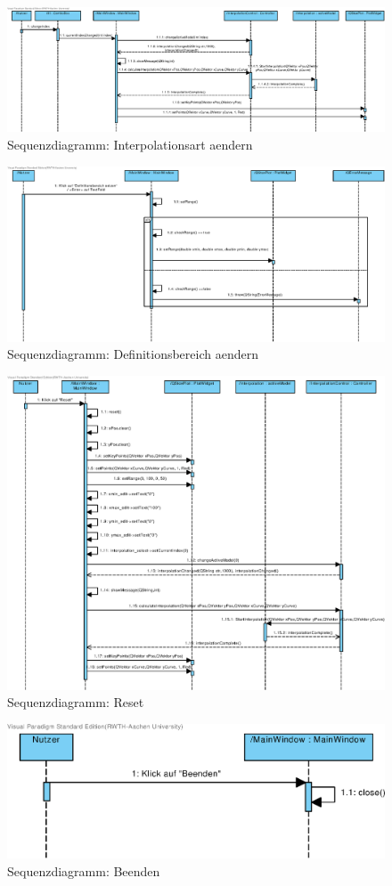 \begin{figure}
\centering
\includegraphics[width=\textwidth]{figures/sequenzdiagramme/interpolation_aendern.eps}
\caption{Sequenzdiagramm: Interpolationsart aendern}
\end{figure}

\begin{figure}
\centering
\includegraphics[width=\textwidth]{figures/sequenzdiagramme/definitionsbereich_aendern.eps}
\caption{Sequenzdiagramm: Definitionsbereich aendern}
\end{figure}

\begin{figure}
\centering
\includegraphics[width=\textwidth]{figures/sequenzdiagramme/Reset.eps}
\caption{Sequenzdiagramm: Reset}
\end{figure}

\begin{figure}
\centering
\includegraphics[width=\textwidth]{figures/sequenzdiagramme/Beenden.eps}
\caption{Sequenzdiagramm: Beenden}
\end{figure}
